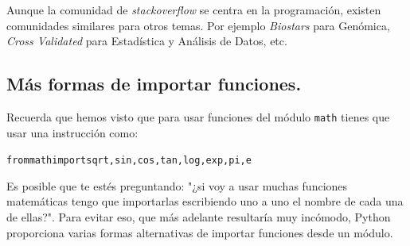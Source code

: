 \documentclass[10pt,a4paper]{article}\usepackage[]{graphicx}\usepackage[]{color}
\makeatletter
\newenvironment{kframe}{%
 \def\at@end@of@kframe{}%
 \ifinner\ifhmode%
  \def\at@end@of@kframe{\end{minipage}}%
  \begin{minipage}{\columnwidth}%
 \fi\fi%
 \def\FrameCommand##1{\hskip\@totalleftmargin \hskip-\fboxsep
 \colorbox{shadecolor}{##1}\hskip-\fboxsep
     \hskip-\linewidth \hskip-\@totalleftmargin \hskip\columnwidth}%
 \MakeFramed {\advance\hsize-\width
   \@totalleftmargin\z@ \linewidth\hsize
   \@setminipage}}%
 {\par\unskip\endMakeFramed%
 \at@end@of@kframe}
\newenvironment{knitrout}{}{} %
\makeatother
\begin{document}
Aunque la comunidad de {\em stackoverflow} se centra en la programación, existen comunidades similares para otros temas. Por ejemplo {\em Biostars} para Genómica, {\em Cross Validated} para Estadística y Análisis de Datos, etc.

\subsection{Más formas de importar funciones.}
\label{tut02:subsec:MasFormasImportarFunciones}

Recuerda que hemos visto que para usar funciones del módulo {\tt math} tienes que usar una instrucción como:
\begin{knitrout}
\color{fgcolor}\begin{kframe}
\begin{alltt}
from math import sqrt, sin, cos, tan, log, exp, pi, e
\end{alltt}
\end{kframe}
\end{knitrout}

Es posible que te estés preguntando: "¿si voy a usar muchas funciones matemáticas tengo que importarlas escribiendo uno a uno el nombre de cada una de ellas?". Para evitar eso, que más adelante resultaría muy incómodo, Python proporciona varias formas alternativas de importar funciones desde un módulo.
\end{document}
